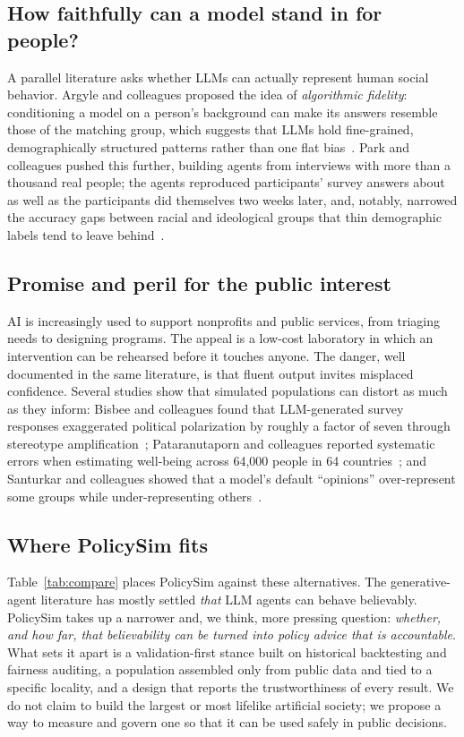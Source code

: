 \documentclass[conference]{IEEEtran}
\begin{document}
\subsection{How faithfully can a model stand in for people?}
A parallel literature asks whether LLMs can actually represent human social behavior. Argyle and colleagues proposed the idea of \emph{algorithmic fidelity}: conditioning a model on a person's background can make its answers resemble those of the matching group, which suggests that LLMs hold fine-grained, demographically structured patterns rather than one flat bias~\cite{argyle2023}. Park and colleagues pushed this further, building agents from interviews with more than a thousand real people; the agents reproduced participants' survey answers about as well as the participants did themselves two weeks later, and, notably, narrowed the accuracy gaps between racial and ideological groups that thin demographic labels tend to leave behind~\cite{park2024}.

\subsection{Promise and peril for the public interest}
AI is increasingly used to support nonprofits and public services, from triaging needs to designing programs. The appeal is a low-cost laboratory in which an intervention can be rehearsed before it touches anyone. The danger, well documented in the same literature, is that fluent output invites misplaced confidence. Several studies show that simulated populations can distort as much as they inform: Bisbee and colleagues found that LLM-generated survey responses exaggerated political polarization by roughly a factor of seven through stereotype amplification~\cite{bisbee2024}; Pataranutaporn and colleagues reported systematic errors when estimating well-being across 64{,}000 people in 64 countries~\cite{pataranutaporn2025}; and Santurkar and colleagues showed that a model's default ``opinions'' over-represent some groups while under-representing others~\cite{santurkar2023}.

\subsection{Where PolicySim fits}
Table~\ref{tab:compare} places PolicySim against these alternatives. The generative-agent literature has mostly settled \emph{that} LLM agents can behave believably. PolicySim takes up a narrower and, we think, more pressing question: \emph{whether, and how far, that believability can be turned into policy advice that is accountable}. What sets it apart is a validation-first stance built on historical backtesting and fairness auditing, a population assembled only from public data and tied to a specific locality, and a design that reports the trustworthiness of every result. We do not claim to build the largest or most lifelike artificial society; we propose a way to measure and govern one so that it can be used safely in public decisions.
\end{document}
